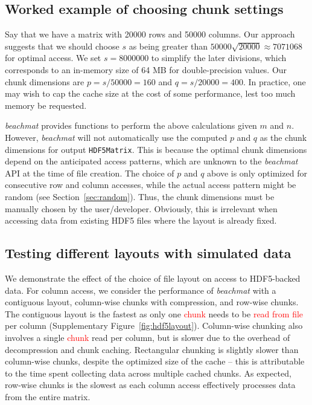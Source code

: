 \documentclass{article}
\newcommand{\beachmat}{\textit{beachmat}}
\newcommand{\revised}[1]{\textcolor{red}{#1}}
\begin{document}
%

\subsection{Worked example of choosing chunk settings}
Say that we have a matrix with 20000 rows and 50000 columns.
Our approach suggests that we should choose $s$ as being greater than $50000\sqrt{20000} \approx 7071068$ for optimal access.
We set $s=8000000$ to simplify the later divisions, which corresponds to an in-memory size of 64 MB for double-precision values.
Our chunk dimensions are $p = s/50000 = 160$ and $q = s/20000 = 400$.
In practice, one may wish to cap the cache size at the cost of some performance, lest too much memory be requested.

\textit{beachmat} provides functions to perform the above calculations given $m$ and $n$.
However, \textit{beachmat} will not automatically use the computed $p$ and $q$ as the chunk dimensions for output \texttt{HDF5Matrix}.
This is because the optimal chunk dimensions depend on the anticipated access patterns, which are unknown to the \textit{beachmat} API at the time of file creation.
The choice of $p$ and $q$ above is only optimized for consecutive row and column accesses, while the actual access pattern might be random (see Section~\ref{sec:random}).
Thus, the chunk dimensions must be manually chosen by the user/developer.
Obviously, this is irrelevant when accessing data from existing HDF5 files where the layout is already fixed.

\subsection{Testing different layouts with simulated data}
We demonstrate the effect of the choice of file layout on access to HDF5-backed data.
For column access, we consider the performance of \beachmat{} with a contiguous layout, column-wise chunks with compression, and row-wise chunks.
The contiguous layout is the fastest as only one \revised{chunk} needs to be \revised{read from file} per column (Supplementary Figure~\ref{fig:hdf5layout}).
Column-wise chunking also involves a single \revised{chunk} read per column, but is slower due to the overhead of decompression and chunk caching.
Rectangular chunking is slightly slower than column-wise chunks, despite the optimized size of the cache -- this is attributable to the time spent collecting data across multiple cached chunks.
As expected, row-wise chunks is the slowest as each column access effectively processes data from the entire matrix.
\end{document}
